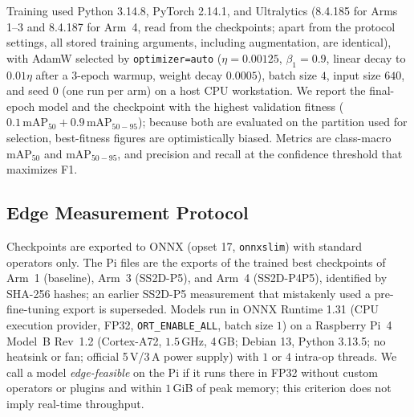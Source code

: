 Training used Python 3.14.8, PyTorch 2.14.1, and Ultralytics (8.4.185 for Arms 1--3 and 8.4.187 for Arm~4, read from the checkpoints; apart from the protocol settings, all stored training arguments, including augmentation, are identical), with AdamW selected by \texttt{optimizer=auto} ($\eta = 0.00125$, $\beta_1 = 0.9$, linear decay to $0.01\eta$ after a $3$-epoch warmup, weight decay $0.0005$), batch size $4$, input size $640$, and seed $0$ (one run per arm) on a host CPU workstation. We report the final-epoch model and the checkpoint with the highest validation fitness ($0.1\,\text{mAP}_{50} + 0.9\,\text{mAP}_{50-95}$); because both are evaluated on the partition used for selection, best-fitness figures are optimistically biased. Metrics are class-macro $\text{mAP}_{50}$ and $\text{mAP}_{50-95}$, and precision and recall at the confidence threshold that maximizes F1.

\subsection{Edge Measurement Protocol}
\label{sec:exp_export}
Checkpoints are exported to ONNX (opset 17, \texttt{onnxslim}) with standard operators only. The Pi files are the exports of the trained best checkpoints of Arm~1 (baseline), Arm~3 (SS2D-P5), and Arm~4 (SS2D-P4P5), identified by SHA-256 hashes; an earlier SS2D-P5 measurement that mistakenly used a pre-fine-tuning export is superseded. Models run in ONNX Runtime 1.31 (CPU execution provider, FP32, \texttt{ORT\_ENABLE\_ALL}, batch size $1$) on a Raspberry Pi~4 Model~B Rev~1.2 (Cortex-A72, $1.5$\,GHz, 4\,GB; Debian 13, Python 3.13.5; no heatsink or fan; official 5\,V/3\,A power supply) with $1$ or $4$ intra-op threads. We call a model \emph{edge-feasible} on the Pi if it runs there in FP32 without custom operators or plugins and within $1$\,GiB of peak memory; this criterion does not imply real-time throughput.

